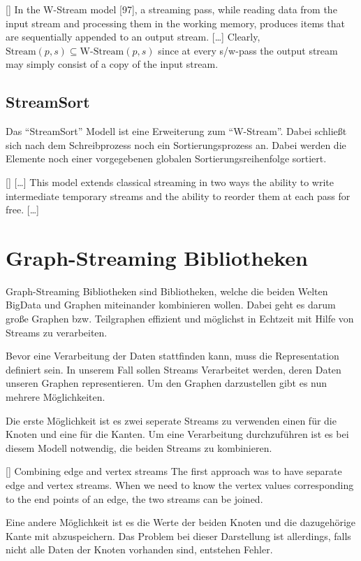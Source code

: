 [\cite{Ribichini2007}]{
In the W-Stream model [97], a streaming pass, while reading data from
the input stream and processing them in the working memory, produces items
that are sequentially appended to an output stream. [\dots]
Clearly, $\text{Stream}(p, s) \subseteq \text{W-Stream}(p, s)$ since at every
s/w-pass the output stream may simply consist of a copy of the input stream.
}

\subsection{StreamSort}
Das \enquote{StreamSort} Modell ist eine Erweiterung zum \enquote{W-Stream}.
Dabei schließt sich nach dem Schreibprozess noch ein Sortierungsprozess an. Dabei
werden die Elemente noch einer vorgegebenen globalen Sortierungsreihenfolge
sortiert.

[\cite{Ribichini2007}]{
[\dots] This model extends classical streaming in two ways the ability to write
intermediate temporary streams and the ability to reorder them at each pass for
free. [\dots]
}

\section{Graph-Streaming Bibliotheken}
Graph-Streaming Bibliotheken sind Bibliotheken, welche die beiden Welten
\gls{BigData} und Graphen miteinander kombinieren wollen. Dabei geht es darum
große Graphen bzw. Teilgraphen effizient und möglichst in Echtzeit mit Hilfe von
Streams zu verarbeiten.

Bevor eine Verarbeitung der Daten stattfinden kann, muss die Representation
definiert sein. In unserem Fall sollen Streams Verarbeitet werden, deren Daten
unseren Graphen representieren. Um den Graphen darzustellen gibt es nun mehrere
Möglichkeiten.

Die erste Möglichkeit ist es zwei seperate Streams zu verwenden einen für die
Knoten und eine für die Kanten. Um eine Verarbeitung durchzuführen ist es bei
diesem Modell notwendig, die beiden Streams zu kombinieren.

[\cite{Bali2015}]{
Combining edge and vertex streams The first approach was to have separate
edge and vertex streams. When we need to know the vertex values corresponding
to the end points of an edge, the two streams can be joined.
}

Eine andere Möglichkeit ist es die Werte der beiden Knoten und die dazugehörige
Kante mit abzuspeichern. Das Problem bei dieser Darstellung ist allerdings, 
falls nicht alle Daten der Knoten vorhanden sind, entstehen Fehler.


